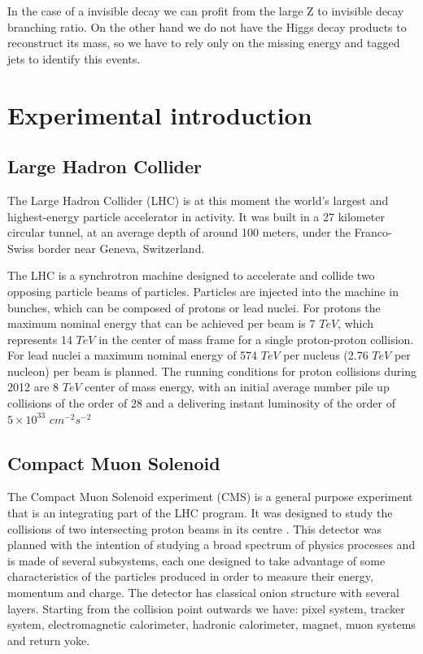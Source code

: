 \documentclass[%
reprint,
amsmath,
amssymb,
aps,
pra,
showkeys
]{revtex4-1}
\begin{document}
In the case of a invisible decay we can profit from the large Z to invisible decay branching ratio. On the other hand
we do not have the Higgs decay products to reconstruct its mass, so we have to rely only on the missing energy and 
tagged jets to identify this events.

\section{Experimental introduction}

\subsection{Large Hadron Collider}

The Large Hadron Collider (LHC) is at this moment the world's largest and highest-energy particle accelerator
in activity. It was built in a 27 kilometer circular tunnel, at an average depth of around 100 meters, under the
Franco-Swiss border near Geneva, Switzerland\cite{Bruning:2004ej}.

The LHC is a synchrotron machine designed to accelerate and collide two opposing particle beams of particles.
Particles are injected into the machine in bunches, which can be composed of protons or lead nuclei. For
protons the maximum nominal energy that can be achieved per beam is 7 $TeV$, which represents 14 $TeV$ in the
center of mass frame for a single proton-proton collision. For lead nuclei a maximum nominal energy of
574 $TeV$ per nucleus (2.76 $TeV$ per nucleon) per beam is planned. The running conditions for proton collisions
during 2012 are 8 $TeV$ center of mass energy, with an initial average number pile up collisions
of the order of 28 and a delivering instant luminosity of the order of $5 \times 10^{33}$ $cm^{-2}s^{-2}$

\subsection{Compact Muon Solenoid}

The Compact Muon Solenoid experiment (CMS) is a general purpose experiment that is an integrating part of the LHC
program. It was designed to study the collisions of two intersecting proton beams in its centre 
\cite{article:CMSTDRv12006}. This detector was planned with the intention of studying a broad spectrum of physics 
processes and is made of several subsystems, each one designed to take advantage of some characteristics of the 
particles produced in order to measure their energy, momentum and charge. The detector has classical onion structure 
with several layers. Starting from the collision point outwards we have: pixel system, tracker system, electromagnetic 
calorimeter, hadronic calorimeter, magnet, muon systems and return yoke.
\end{document}
